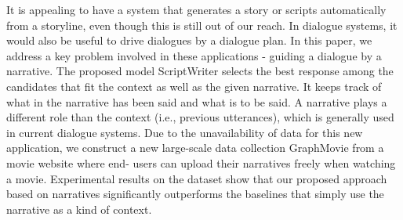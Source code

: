 It is appealing to have a system that generates a story or scripts automatically from a storyline, even though this is still out of our reach. In dialogue systems, it would also be useful to drive dialogues by a dialogue plan. In this paper, we address a key problem involved in these applications - guiding a dialogue by a narrative. The proposed model ScriptWriter selects the best response among the candidates that fit the context as well as the given narrative. It keeps track of what in the narrative has been said and what is to be said. A narrative plays a different role than the context (i.e., previous utterances), which is generally used in current dialogue systems. Due to the unavailability of data for this new application, we construct a new large-scale data collection GraphMovie from a movie website where end- users can upload their narratives freely when watching a movie. Experimental results on the dataset show that our proposed approach based on narratives significantly outperforms the baselines that simply use the narrative as a kind of context.
